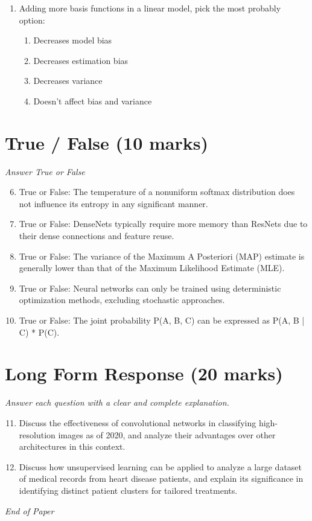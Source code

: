 \documentclass[12pt]{article}
\begin{document}
\begin{enumerate}[label=\arabic*.]
\begin{enumerate}[label=(\alph*)]
    \item P(X, Y, Z) = P(Y) * P(X|Y) * P(Z|Y)
    \item P(X, Y, Z) = P(X) * P(Y|X) * P(Z|Y)
    \item P(X, Y, Z) = P(Z) * P(X|Z) * P(Y|Z)
    \item P(X, Y, Z) = P(X) * P(Y) * P(Z)
\end{enumerate}
\item Adding more basis functions in a linear model, pick the most probably option:
\begin{enumerate}[label=(\alph*)]
    \item Decreases model bias
    \item Decreases estimation bias
    \item Decreases variance
    \item Doesn't affect bias and variance
\end{enumerate}
\end{enumerate}

\section*{True / False (10 marks)}
\textit{Answer True or False}
\begin{enumerate}[label=\arabic*.]
\setcounter{enumi}{5}
\item True or False: The temperature of a nonuniform softmax distribution does not influence its entropy in any significant manner.
\item True or False: DenseNets typically require more memory than ResNets due to their dense connections and feature reuse.
\item True or False: The variance of the Maximum A Posteriori (MAP) estimate is generally lower than that of the Maximum Likelihood Estimate (MLE).
\item True or False: Neural networks can only be trained using deterministic optimization methods, excluding stochastic approaches.
\item True or False: The joint probability P(A, B, C) can be expressed as P(A, B | C) * P(C).
\end{enumerate}

\section*{Long Form Response (20 marks)}
\textit{Answer each question with a clear and complete explanation.}
\begin{enumerate}[label=\arabic*.]
\setcounter{enumi}{10}
\item Discuss the effectiveness of convolutional networks in classifying high-resolution images as of 2020, and analyze their advantages over other architectures in this context.
\item Discuss how unsupervised learning can be applied to analyze a large dataset of medical records from heart disease patients, and explain its significance in identifying distinct patient clusters for tailored treatments.
\end{enumerate}

\vfill
\noindent\textit{End of Paper}
\end{document}
